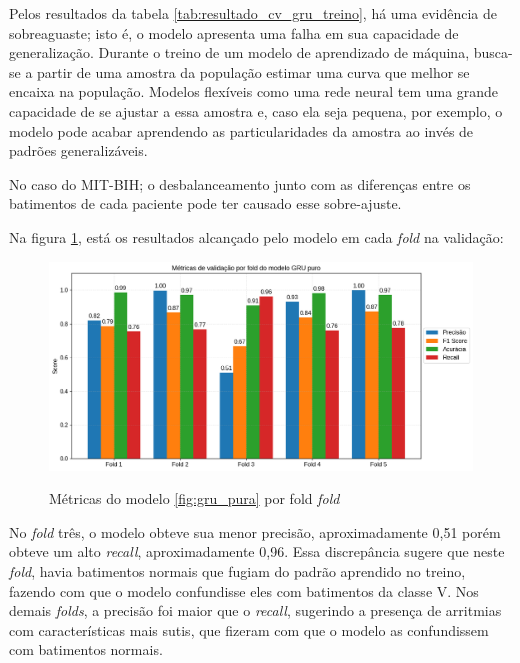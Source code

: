 Pelos resultados da tabela \ref{tab:resultado_cv_gru_treino}, há uma evidência de sobreaguaste; isto é, o modelo apresenta uma falha em sua capacidade
de generalização. Durante o treino de um modelo de aprendizado de máquina, busca-se a partir de uma amostra da população estimar uma curva que melhor
se encaixa na população. Modelos flexíveis como uma rede neural tem uma grande capacidade de se ajustar a essa amostra e, caso ela seja pequena, por exemplo,
o modelo pode acabar aprendendo as particularidades da amostra ao invés de padrões generalizáveis. 

No caso do MIT-BIH; o desbalanceamento junto com as diferenças entre os batimentos de cada paciente pode ter causado esse sobre-ajuste.

Na figura \ref{fig:gru_resultados_por_fold}, está os resultados alcançado pelo modelo em cada \textit{fold} na validação:

\begin{figure}[H]
  \centering
  \caption{Métricas do modelo \ref{fig:gru_pura} por fold \textit{fold}}
   \includegraphics[width=1.0\textwidth]{figuras/modelos_resultados/gru/gru_metricas_por_fold.png} %
  \label{fig:gru_resultados_por_fold}
\end{figure}

No \textit{fold} três, o modelo obteve sua menor precisão, aproximadamente 0,51 porém obteve um alto \textit{recall}, aproximadamente 0,96.
Essa discrepância sugere que neste \textit{fold}, havia batimentos normais que fugiam do padrão aprendido no treino, fazendo com que o modelo
confundisse eles com batimentos da classe V. Nos demais \textit{folds}, a precisão foi maior que o \textit{recall}, sugerindo a presença 
de arritmias com características mais sutis, que fizeram com que o modelo as confundissem com batimentos normais.

